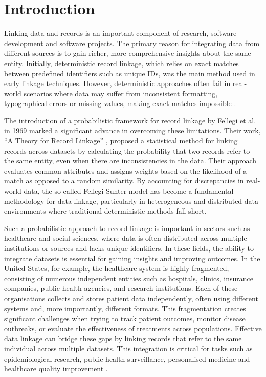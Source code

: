 \chapter{Introduction}  \label{sec:introduction}

Linking data and records is an important component of research, software development and software projects.
The primary reason for integrating data from different sources is to gain richer, more comprehensive insights about the same entity.
Initially, deterministic record linkage, which relies on exact matches between predefined identifiers such as unique IDs, was the main method used in early linkage techniques. 
However, deterministic approaches often fail in real-world scenarios where data may suffer from inconsistent formatting, typographical errors or missing values, making exact matches impossible \cite{herzog2007data}.

The introduction of a probabilistic framework for record linkage by Fellegi et al. in 1969 \cite{fellegi1969theory} marked a significant advance in overcoming these limitations. 
Their work, \enquote{A Theory for Record Linkage} \cite{fellegi1969theory}, proposed a statistical method for linking records across datasets by calculating the probability that two records refer to the same entity, even when there are inconsistencies in the data. 
Their approach evaluates common attributes and assigns weights based on the likelihood of a match as opposed to a random similarity. 
By accounting for discrepancies in real-world data, the so-called Fellegi-Sunter model has become a fundamental methodology for data linkage, particularly in heterogeneous and distributed data environments where traditional deterministic methods fall short.

Such a probabilistic approach to record linkage is important in sectors such as healthcare and social sciences, where data is often distributed across multiple institutions or sources and lacks unique identifiers. 
In these fields, the ability to integrate datasets is essential for gaining insights and improving outcomes.
In the United States, for example, the healthcare system is highly fragmented, consisting of numerous independent entities such as hospitals, clinics, insurance companies, public health agencies, and research institutions. 
Each of these organisations collects and stores patient data independently, often using different systems and, more importantly, different formats. 
This fragmentation creates significant challenges when trying to track patient outcomes, monitor disease outbreaks, or evaluate the effectiveness of treatments across populations.
Effective data linkage can bridge these gaps by linking records that refer to the same individual across multiple datasets.
This integration is critical for tasks such as epidemiological research, public health surveillance, personalised medicine and healthcare quality improvement \cite{pathak2024privacy, vatsalan2017privacy}.

